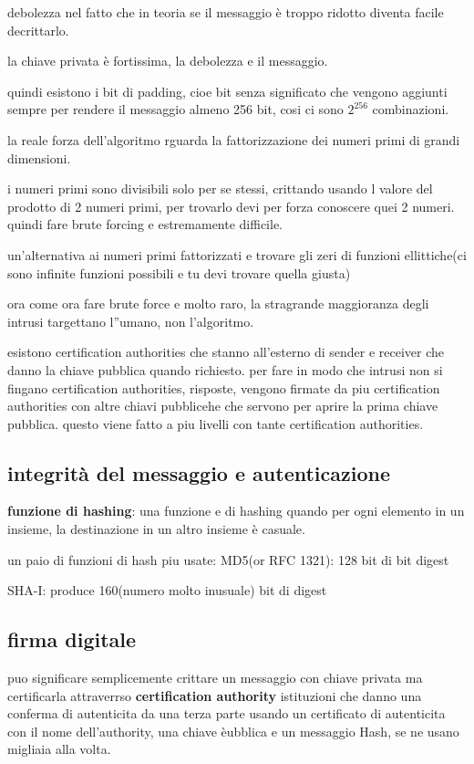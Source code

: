 \documentclass[12pt]{article}
\begin{document}
debolezza nel fatto che in teoria se il messaggio è troppo ridotto diventa facile decrittarlo.

la chiave privata è fortissima, la debolezza e il messaggio.

quindi esistono i bit di padding, cioe bit senza significato che vengono aggiunti sempre per rendere il messaggio almeno 256 bit, cosi ci sono $2^256$ combinazioni.

la reale forza dell'algoritmo rguarda la fattorizzazione dei numeri primi di grandi dimensioni.

i numeri primi sono divisibili solo per se stessi, crittando usando l valore del prodotto di 2 numeri primi, per trovarlo devi per forza conoscere quei 2 numeri.
quindi fare brute forcing e estremamente difficile.

un'alternativa ai numeri primi fattorizzati e trovare gli zeri di funzioni ellittiche(ci sono infinite funzioni possibili e tu devi trovare quella giusta)

ora come ora fare brute force e molto raro, la stragrande maggioranza degli intrusi targettano l''umano, non l'algoritmo.

esistono certification authorities che stanno all'esterno di sender e receiver che danno la chiave pubblica quando richiesto.
per fare in modo che intrusi non si fingano certification authorities, risposte, vengono firmate da piu certification authorities con altre chiavi pubblicehe che servono per aprire la prima chiave pubblica.
questo viene fatto a piu livelli con tante certification authorities.



\subsection{integrità del messaggio e autenticazione}

\textbf{funzione di hashing}: una funzione  e di hashing quando per ogni elemento in un insieme, la destinazione in un altro insieme è casuale.

un paio di funzioni di hash piu usate:
MD5(or RFC 1321): 128 bit di bit digest

SHA-I: produce 160(numero molto inusuale) bit di digest

\subsection{firma digitale}

puo significare semplicemente crittare un messaggio con chiave privata ma certificarla attraverrso \textbf{certification authority} istituzioni che danno una conferma di autenticita da una terza parte usando un certificato di autenticita con il nome dell'authority, una chiave èubblica e un messaggio Hash, se ne usano migliaia alla volta.
\end{document}
